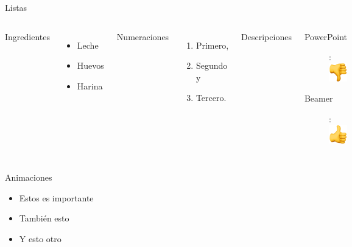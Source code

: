 \documentclass[10pt]{beamer}
\begin{document}
\begin{frame}{Listas}
  \begin{columns}[T,onlytextwidth]
      Ingredientes
      \begin{itemize}
        \item Leche \item Huevos \item Harina
      \end{itemize}

      Numeraciones
      \begin{enumerate}
        \item Primero, \item Segundo y \item Tercero.
      \end{enumerate}

      Descripciones
      \begin{description}
        \item[PowerPoint]: \includegraphics[scale=.1]{down} \item[Beamer]: \includegraphics[scale=.1]{up}
      \end{description}
  \end{columns}
\end{frame}
\begin{frame}{Animaciones}
  \begin{itemize}[<+- | alert@+>]
    \item \alert<4>{Estos es importante}
    \item También esto
    \item Y esto otro
  \end{itemize}
\end{frame}
\end{document}
